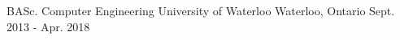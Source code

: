 \begin{cventries}
  \cventry
    {BASc. Computer Engineering}
    {University of Waterloo}
    {Waterloo, Ontario}
    {Sept. 2013 - Apr. 2018}
    {
    }
\end{cventries}

